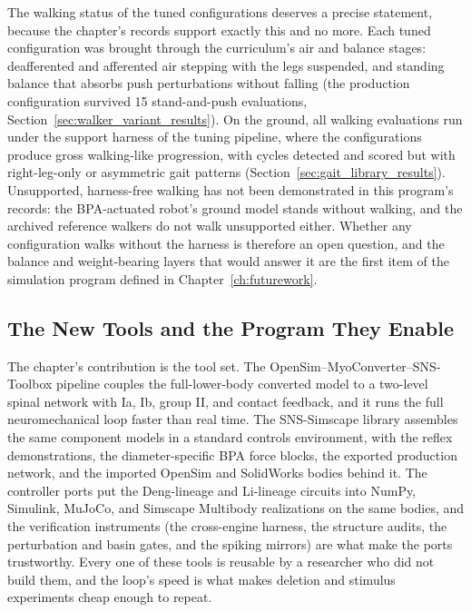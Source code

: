 The walking status of the tuned configurations deserves a precise statement, because the chapter's records support exactly this and no more. Each tuned configuration was brought through the curriculum's air and balance stages: deafferented and afferented air stepping with the legs suspended, and standing balance that absorbs push perturbations without falling (the production configuration survived 15 stand-and-push evaluations, Section~\ref{sec:walker_variant_results}). On the ground, all walking evaluations run under the support harness of the tuning pipeline, where the configurations produce gross walking-like progression, with cycles detected and scored but with right-leg-only or asymmetric gait patterns (Section~\ref{sec:gait_library_results}). Unsupported, harness-free walking has not been demonstrated in this program's records: the BPA-actuated robot's ground model stands without walking, and the archived reference walkers do not walk unsupported either. Whether any configuration walks without the harness is therefore an open question, and the balance and weight-bearing layers that would answer it are the first item of the simulation program defined in Chapter~\ref{ch:futurework}.

\subsection{The New Tools and the Program They Enable}\label{sec:sns_tools_summary}

The chapter's contribution is the tool set. The OpenSim--MyoConverter--SNS-Toolbox pipeline couples the full-lower-body converted model to a two-level spinal network with Ia, Ib, group II, and contact feedback, and it runs the full neuromechanical loop faster than real time. The SNS-Simscape library assembles the same component models in a standard controls environment, with the reflex demonstrations, the diameter-specific BPA force blocks, the exported production network, and the imported OpenSim and SolidWorks bodies behind it. The controller ports put the Deng-lineage and Li-lineage circuits into NumPy, Simulink, MuJoCo, and Simscape Multibody realizations on the same bodies, and the verification instruments (the cross-engine harness, the structure audits, the perturbation and basin gates, and the spiking mirrors) are what make the ports trustworthy. Every one of these tools is reusable by a researcher who did not build them, and the loop's speed is what makes deletion and stimulus experiments cheap enough to repeat.

